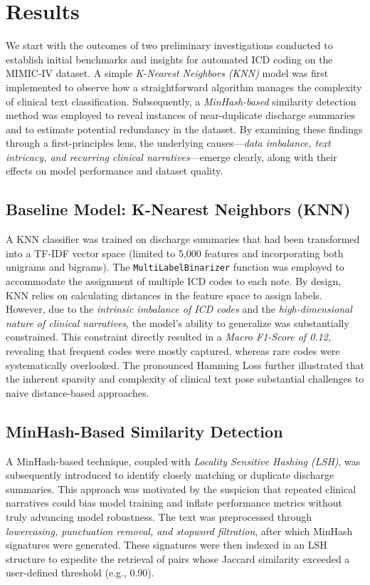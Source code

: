 \chapter{Results}
\label{chap:results}

We start with the outcomes of two preliminary investigations conducted to establish initial benchmarks and insights for automated ICD coding on the MIMIC-IV dataset. A simple \emph{K-Nearest Neighbors (KNN)} model was first implemented to observe how a straightforward algorithm manages the complexity of clinical text classification. Subsequently, a \emph{MinHash-based} similarity detection method was employed to reveal instances of near-duplicate discharge summaries and to estimate potential redundancy in the dataset. By examining these findings through a first-principles lens, the underlying causes—\emph{data imbalance, text intricacy, and recurring clinical narratives}—emerge clearly, along with their effects on model performance and dataset quality.

\section{Baseline Model: K-Nearest Neighbors (KNN)}
A KNN classifier was trained on discharge summaries that had been transformed into a TF-IDF vector space (limited to 5{,}000 features and incorporating both unigrams and bigrams). The \texttt{MultiLabelBinarizer} function was employed to accommodate the assignment of multiple ICD codes to each note. By design, KNN relies on calculating distances in the feature space to assign labels. However, due to the \emph{intrinsic imbalance of ICD codes} and the \emph{high-dimensional nature of clinical narratives}, the model’s ability to generalize was substantially constrained. This constraint directly resulted in a \emph{Macro F1-Score of 0.12}, revealing that frequent codes were mostly captured, whereas rare codes were systematically overlooked. The pronounced Hamming Loss further illustrated that the inherent sparsity and complexity of clinical text pose substantial challenges to naive distance-based approaches.

\section{MinHash-Based Similarity Detection}
A MinHash-based technique, coupled with \emph{Locality Sensitive Hashing (LSH)}, was subsequently introduced to identify closely matching or duplicate discharge summaries. This approach was motivated by the suspicion that repeated clinical narratives could bias model training and inflate performance metrics without truly advancing model robustness. The text was preprocessed through \emph{lowercasing, punctuation removal, and stopword filtration}, after which MinHash signatures were generated. These signatures were then indexed in an LSH structure to expedite the retrieval of pairs whose Jaccard similarity exceeded a user-defined threshold (e.g., 0.90).

